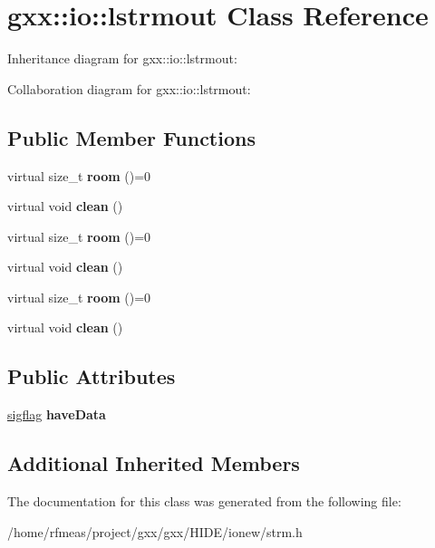 \hypertarget{classgxx_1_1io_1_1lstrmout}{}\section{gxx\+:\+:io\+:\+:lstrmout Class Reference}
\label{classgxx_1_1io_1_1lstrmout}


Inheritance diagram for gxx\+:\+:io\+:\+:lstrmout\+:


Collaboration diagram for gxx\+:\+:io\+:\+:lstrmout\+:
\subsection*{Public Member Functions}
\begin{DoxyCompactItemize}
\item 
virtual size\+\_\+t {\bfseries room} ()=0\hypertarget{classgxx_1_1io_1_1lstrmout_a6ff1d6f622f56335197b34ff4a1e3b12}{}\label{classgxx_1_1io_1_1lstrmout_a6ff1d6f622f56335197b34ff4a1e3b12}

\item 
virtual void {\bfseries clean} ()\hypertarget{classgxx_1_1io_1_1lstrmout_abe3ebd1703a208c1c6aa73f3c4501723}{}\label{classgxx_1_1io_1_1lstrmout_abe3ebd1703a208c1c6aa73f3c4501723}

\item 
virtual size\+\_\+t {\bfseries room} ()=0\hypertarget{classgxx_1_1io_1_1lstrmout_a6ff1d6f622f56335197b34ff4a1e3b12}{}\label{classgxx_1_1io_1_1lstrmout_a6ff1d6f622f56335197b34ff4a1e3b12}

\item 
virtual void {\bfseries clean} ()\hypertarget{classgxx_1_1io_1_1lstrmout_abe3ebd1703a208c1c6aa73f3c4501723}{}\label{classgxx_1_1io_1_1lstrmout_abe3ebd1703a208c1c6aa73f3c4501723}

\item 
virtual size\+\_\+t {\bfseries room} ()=0\hypertarget{classgxx_1_1io_1_1lstrmout_a6ff1d6f622f56335197b34ff4a1e3b12}{}\label{classgxx_1_1io_1_1lstrmout_a6ff1d6f622f56335197b34ff4a1e3b12}

\item 
virtual void {\bfseries clean} ()\hypertarget{classgxx_1_1io_1_1lstrmout_abe3ebd1703a208c1c6aa73f3c4501723}{}\label{classgxx_1_1io_1_1lstrmout_abe3ebd1703a208c1c6aa73f3c4501723}

\end{DoxyCompactItemize}
\subsection*{Public Attributes}
\begin{DoxyCompactItemize}
\item 
\hyperlink{classgxx_1_1sigflag}{sigflag} {\bfseries have\+Data}\hypertarget{classgxx_1_1io_1_1lstrmout_a9e3a307517935ba31cbe2cfd21a8fa08}{}\label{classgxx_1_1io_1_1lstrmout_a9e3a307517935ba31cbe2cfd21a8fa08}

\end{DoxyCompactItemize}
\subsection*{Additional Inherited Members}


The documentation for this class was generated from the following file\+:\begin{DoxyCompactItemize}
\item 
/home/rfmeas/project/gxx/gxx/\+H\+I\+D\+E/ionew/strm.\+h\end{DoxyCompactItemize}
